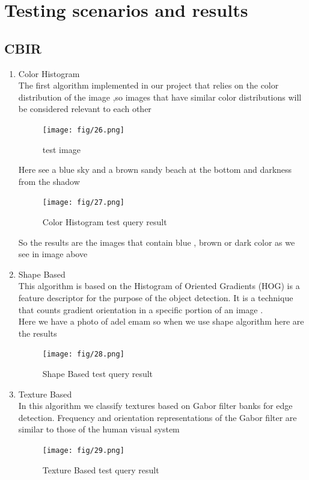 \documentclass[pdftex,10pt,a4paper,oneside]{article}
\begin{document}
	
	
	
	\pagebreak
	\section{Testing scenarios and results}
	\subsection{CBIR}
	\begin{enumerate}
		\item Color Histogram \\
		The first algorithm implemented  in our project that relies on the color distribution of the image ,so images that have similar color distributions will be considered relevant to each other
		\begin{figure}[H]
			\centering
			\texttt{[image: fig/26.png]}
			\caption{test image }
			\label{test image}
		\end{figure}
	Here see a blue sky and a brown sandy beach at the bottom and darkness from the shadow
	\begin{figure}[H]
		\centering
		\texttt{[image: fig/27.png]}
		\caption{ Color Histogram test query result}
		\label{Color Histogram test query result}
	\end{figure}
So the results are the images that contain blue , brown or dark color as we see in image above
\item Shape Based\\
This algorithm is based on the Histogram of Oriented Gradients (HOG) is a feature descriptor for the purpose of the object detection. It is a technique that counts  gradient orientation in a specific portion of an image .\\
Here we have a photo of adel emam so when we use shape algorithm here are the results
	\begin{figure}[H]
		\centering
		\texttt{[image: fig/28.png]}
		\caption{Shape Based test query result }
		\label{Shape Based test query result}
	\end{figure}
\item Texture Based\\
In this algorithm we  classify textures based on Gabor filter banks for edge detection. Frequency and orientation representations of the Gabor filter are similar to those of the human visual system
		\begin{figure}[H]
		\centering
		\texttt{[image: fig/29.png]}
		\caption{Texture Based test query result}
		\label{Texture Based test query result}
	\end{figure}
	\end{enumerate}
\end{document}
